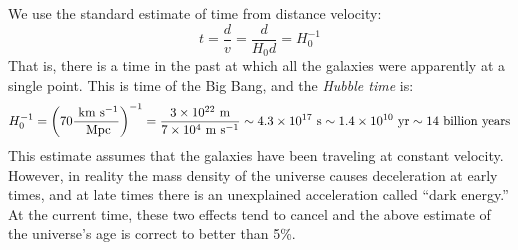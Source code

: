 \begin{enumerate}
  \begin{answer}
    We use the standard estimate of time from distance velocity:
    \begin{equation}
      t = \frac{d}{v} = \frac{d}{H_0 d} = H_0^{-1}
    \end{equation}
    That is, there is a time in the past at which all the galaxies
    were apparently at a single point. This is time of the Big Bang,
    and the {\it Hubble time} is:
    \begin{equation}
      H_0^{-1} = \left(70 \frac{{\rm ~km} {\rm ~s}^{-1}}{{\rm
          ~Mpc}}\right)^{-1} =  \frac{3 \times 10^{22} {\rm ~m}}{7
        \times 10^4 {\rm ~m} {\rm ~s}^{-1}} \sim 4.3 \times 10^{17}
      {\rm ~s} \sim 1.4 \times 10^{10} {\rm ~yr} \sim 14 {\rm
        ~billion~years}
    \end{equation}
    This estimate assumes that the galaxies have been traveling at
    constant velocity. However, in reality the mass density of the
    universe causes deceleration at early times, and at late times
    there is an unexplained acceleration called ``dark energy.'' At
    the current time, these two effects tend to cancel and the above
    estimate of the universe's age is correct to better than 5\%.
  \end{answer}
\end{enumerate}   






  
